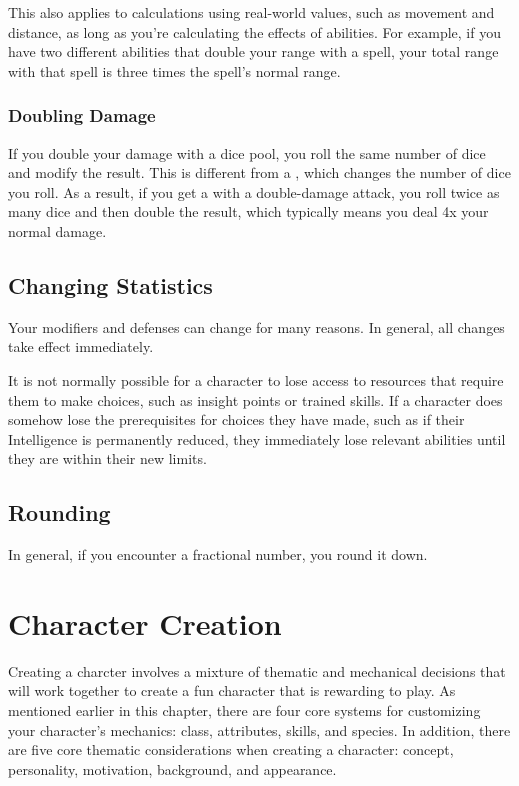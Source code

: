         This also applies to calculations using real-world values, such as movement and distance, as long as you're calculating the effects of abilities.
        For example, if you have two different abilities that double your range with a spell, your total range with that spell is three times the spell's normal range.

        \subsubsection{Doubling Damage}
            If you double your damage with a dice pool, you roll the same number of dice and modify the result.
            This is different from a , which changes the number of dice you roll.
            As a result, if you get a  with a double-damage attack, you roll twice as many dice and then double the result, which typically means you deal 4x your normal damage.

    \subsection{Changing Statistics}

        Your modifiers and defenses can change for many reasons.
        In general, all changes take effect immediately.

        It is not normally possible for a character to lose access to resources that require them to make choices, such as insight points or trained skills.
        If a character does somehow lose the prerequisites for choices they have made, such as if their Intelligence is permanently reduced, they immediately lose relevant abilities until they are within their new limits.

    \subsection{Rounding}
        In general, if you encounter a fractional number, you round it down.

\section{Character Creation}\label{Character Creation}

    Creating a charcter involves a mixture of thematic and mechanical decisions that will work together to create a fun character that is rewarding to play.
    As mentioned earlier in this chapter, there are four core systems for customizing your character's mechanics: class, attributes, skills, and species.
    In addition, there are five core thematic considerations when creating a character: concept, personality, motivation, background, and appearance.

